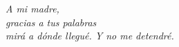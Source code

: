 \chapter*{}
\begin{flushright}
  \textit{
    A mi madre, \\
    gracias a tus palabras \\
    mirá a dónde llegué. Y no me detendré. 
  }
\end{flushright}
